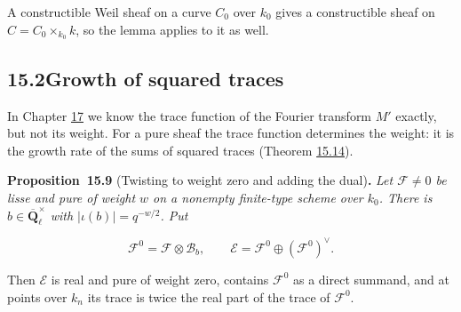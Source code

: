 \documentclass[11pt]{article}
\newenvironment{bpstatement}[2]{\par\addvspace{0.6\baselineskip}\noindent\textbf{#1}#2\textbf{.}\enspace\ignorespaces}
  {\par\addvspace{0.4\baselineskip}}
\newenvironment{bpstatementit}[2]{\begin{bpstatement}{#1}{#2}\itshape\ignorespaces}{\end{bpstatement}}
\begin{document}
\label{bp145}%
A constructible Weil sheaf on a curve \(C_0\) over \(k_0\) gives a constructible sheaf on \(C=C_0\times_{k_0}k\), so the lemma applies to it as well.


\subsection*{\texorpdfstring{15.2\quad Growth of squared traces}{15.2 Growth of squared traces}}
\label{bp146}%
\label{bp147}%
In Chapter \hyperref[bp223]{17} we know the trace function of the Fourier transform \(M'\) exactly, but not its weight. For a pure sheaf the trace function determines the weight: it is the growth rate of the sums of squared traces (Theorem \hyperref[bp162]{15.14}).

\label{bp148}%
\begin{bpstatementit}{Proposition~15.9}{ (Twisting to weight zero and adding the dual)}
Let \(\mathcal F\ne0\) be lisse and pure of weight \(w\) on a nonempty finite-type scheme over \(k_0\).  There is \(b\in\overline{\mathbf Q}_\ell^\times\) with \(|\iota(b)|=q^{-w/2}\).  Put

\[
\mathcal F^0=\mathcal F\otimes\mathcal B_b,
\qquad \mathcal E=\mathcal F^0\oplus(\mathcal F^0)^\vee.
\]

Then \(\mathcal E\) is real and pure of weight zero, contains \(\mathcal F^0\) as a direct summand, and at points over \(k_n\) its trace is twice the real part of the trace of \(\mathcal F^0\).
\end{bpstatementit}
\end{document}
